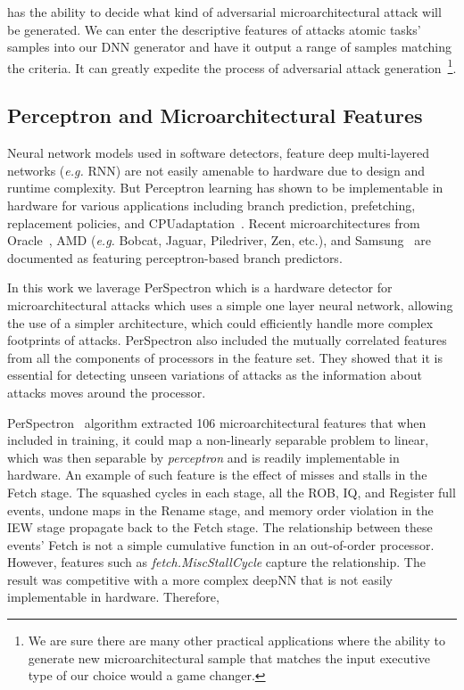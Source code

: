  {\scheme} has the ability to decide what kind of adversarial microarchitectural attack will be generated. We can enter the descriptive features of attacks atomic tasks' samples into our DNN generator and have it output a range of samples matching the criteria. It can greatly expedite the process of adversarial attack generation~\footnote{We are sure there are many other practical applications where the ability to generate new microarchitectural sample that matches the input executive type of our choice would a game changer.}.
 
 \subsection{Perceptron and Microarchitectural Features}

 


Neural network models used in software detectors, feature deep multi-layered  networks ({\em e.g.} RNN) are not easily amenable to hardware due to design and runtime complexity. But Perceptron learning has shown to be implementable in hardware for various  applications including branch prediction, prefetching, replacement policies, and CPUadaptation~\cite{intelISCA2019}. Recent microarchitectures from Oracle~\cite{SPARCT4}, AMD ({\em e.g.} Bobcat, Jaguar, Piledriver, Zen, etc.), and Samsung~\cite{Mongoose,M3} are documented as featuring perceptron-based branch predictors.

In this work we laverage PerSpectron which is a  hardware detector for microarchitectural attacks which uses a simple one layer neural network,  allowing the use of a simpler architecture, which could efficiently 
handle more complex footprints of attacks. 
PerSpectron also included the mutually correlated features from all the components of processors in the feature set. They showed that it is essential for detecting unseen variations of attacks as the information about attacks moves around the processor.


PerSpectron~\cite{PerSpectron} algorithm extracted 106 microarchitectural features that when included in training, it could map a non-linearly separable problem to linear, which was then 
separable by {\em perceptron} and is readily implementable in hardware. An example of such feature is the effect of misses and stalls 
in the Fetch stage. The squashed cycles in each stage, all the ROB, IQ, and 
Register full events, undone maps in the Rename stage, and memory order 
violation in the IEW stage propagate back to the Fetch stage. The relationship 
between these events' Fetch is not a simple cumulative function in an out-of-order 
processor. 
However, features such as \textit{fetch.MiscStallCycle} capture the 
relationship.
The result was competitive 
with a more complex deepNN that is not easily implementable in hardware. Therefore,

